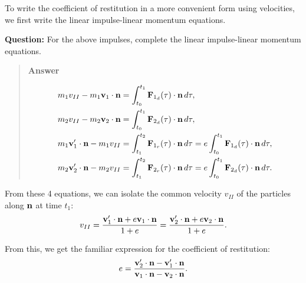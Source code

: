 \documentclass[
  letterpaper,
  DIV=11,
  numbers=noendperiod]{scrreprt}
\begin{document}
To write the coefficient of restitution in a more convenient form using
velocities, we first write the linear impulse-linear momentum equations.

\begin{tcolorbox}[enhanced jigsaw, arc=.35mm, bottomrule=.15mm, bottomtitle=1mm, breakable, colback=white, colbacktitle=quarto-callout-tip-color!10!white, colframe=quarto-callout-tip-color-frame, coltitle=black, left=2mm, leftrule=.75mm, opacityback=0, opacitybacktitle=0.6, rightrule=.15mm, title=\textcolor{quarto-callout-tip-color}{\faLightbulb}\hspace{0.5em}{Think!}, titlerule=0mm, toprule=.15mm, toptitle=1mm]

\textbf{Question:} For the above impulses, complete the linear
impulse-linear momentum equations.

\begin{quote}
\textbf{Answer}

\begin{align}
    \begin{split}
        & m_1 v_{II} - m_1{\bf v}_1\cdot{\bf n} = \int_{t_0}^{t_1}{\bf F}_{1_d}(\tau)\cdot{\bf n}\,d\tau,\\
        & m_2 v_{II} - m_2{\bf v}_2\cdot{\bf n} = \int_{t_0}^{t_1}{\bf F}_{2_d}(\tau)\cdot{\bf n}\,d\tau,\\
        & m_1{\bf v}_1'\cdot{\bf n}-m_1 v_{II} = \int_{t_1}^{t_2}{\bf F}_{1_r}(\tau)\cdot{\bf n}\,d\tau = e\int_{t_0}^{t_1}{\bf F}_{1_d}(\tau)\cdot{\bf n}\,d\tau,\\
        & m_2{\bf v}_2'\cdot{\bf n}-m_2 v_{II} = \int_{t_1}^{t_2}{\bf F}_{2_r}(\tau)\cdot{\bf n}\,d\tau = e\int_{t_0}^{t_1}{\bf F}_{2_d}(\tau)\cdot{\bf n}\,d\tau.
    \end{split}
\end{align}
\end{quote}

\end{tcolorbox}

From these 4 equations, we can isolate the common velocity \(v_{II}\) of
the particles along \({\bf n}\) at time \(t_1\): \begin{align}
    v_{II} = \frac{{\bf v}_1'\cdot{\bf n}+e{\bf v}_1\cdot{\bf n}}{1+e} = \frac{{\bf v}_2'\cdot{\bf n}+e{\bf v}_2\cdot{\bf n}}{1+e}.
\end{align}

From this, we get the familiar expression for the coefficient of
restitution: \begin{align}
    e = \frac{{\bf v}_2'\cdot{\bf n}-{\bf v}_1'\cdot{\bf n}}{{\bf v}_1\cdot{\bf n}-{\bf v}_2\cdot{\bf n}}.
\end{align}
\end{document}

